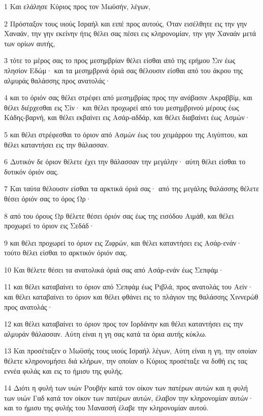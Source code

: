 \par 1 Και ελάλησε Κύριος προς τον Μωϋσήν, λέγων,
\par 2 Πρόσταξον τους υιούς Ισραήλ και ειπέ προς αυτούς, Όταν εισέλθητε εις την γην Χαναάν, την γην εκείνην ήτις θέλει σας πέσει εις κληρονομίαν, την γην Χαναάν μετά των ορίων αυτής,
\par 3 τότε το μέρος σας το προς μεσημβρίαν θέλει είσθαι από της ερήμου Σιν έως πλησίον Εδώμ· και τα μεσημβρινά όριά σας θέλουσιν είσθαι από του άκρου της αλμυράς θαλάσσης προς ανατολάς·
\par 4 και το όριόν σας θέλει στρέφει από μεσημβρίας προς την ανάβασιν Ακραββίμ, και θέλει διέρχεσθαι εις Σίν· και θέλει προχωρεί από του μεσημβρινού μέρους έως Κάδης-βαρνή, και θέλει εκβαίνει εις Ασάρ-αδδάρ, και θέλει διαβαίνει έως Ασμών·
\par 5 και θέλει στρέφεσθαι το όριον από Ασμών έως του χειμάρρου της Αιγύπτου, και θέλει καταντήσει εις την θάλασσαν.
\par 6 Δυτικόν δε όριον θέλετε έχει την θάλασσαν την μεγάλην· αύτη θέλει είσθαι το δυτικόν όριόν σας.
\par 7 Και ταύτα θέλουσιν είσθαι τα αρκτικά όριά σας· από της μεγάλης θαλάσσης θέλετε θέσει όριόν σας το όρος Ωρ·
\par 8 από του όρους Ωρ θέλετε θέσει όριόν σας έως της εισόδου Αιμάθ, και θέλει προχωρεί το όριον εις Σεδάδ·
\par 9 και θέλει προχωρεί το όριον εις Ζιφρών, και θέλει καταντήσει εις Ασάρ-ενάν· τούτο θέλει είσθαι το αρκτικόν όριόν σας.
\par 10 Και θέλετε θέσει τα ανατολικά όριά σας από Ασάρ-ενάν έως Σεπφάμ·
\par 11 και θέλει καταβαίνει το όριον από Σεπφάμ έως Ριβλά, προς ανατολάς του Αείν· και θέλει καταβαίνει το όριον και θέλει φθάνει εις το πλάγιον της θαλάσσης Χιννερώθ προς ανατολάς·
\par 12 και θέλει καταβαίνει το όριον προς τον Ιορδάνην και θέλει καταντήσει εις την αλμυράν θάλασσαν. Αύτη είναι η γη σας κατά τα όρια αυτής κύκλω.
\par 13 Και προσέταξεν ο Μωϋσής τους υιούς Ισραήλ λέγων, Αύτη είναι η γη, την οποίαν θέλετε κληρονομήσει διά κλήρων, την οποίαν ο Κύριος προσέταξε να δοθή εις τας εννέα φυλάς και εις το ήμισυ της φυλής.
\par 14 Διότι η φυλή των υιών Ρουβήν κατά τον οίκον των πατέρων αυτών και η φυλή των υιών Γαδ κατά τον οίκον των πατέρων αυτών, έλαβον την κληρονομίαν αυτών· και το ήμισυ της φυλής του Μανασσή έλαβε την κληρονομίαν αυτού.
